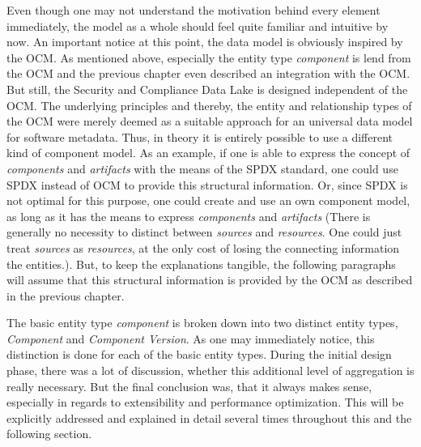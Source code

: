 Even though one may not understand the motivation behind every element immediately, the model as a whole should feel quite familiar and intuitive by now. An important notice at this point, the data model is obviously inspired by the OCM. As mentioned above, especially the entity type \emph{component} is lend from the OCM and the previous chapter even described an integration with the OCM. But still, the Security and Compliance Data Lake is designed independent of the OCM. The underlying principles and thereby, the entity and relationship types of the OCM were merely deemed as a suitable approach for an universal data model for software metadata. Thus, in theory it is entirely possible to use a different kind of component model. As an example, if one is able to express the concept of \emph{components} and \emph{artifacts} with the means of the SPDX standard, one could use SPDX instead of OCM to provide this structural information. Or, since SPDX is not optimal for this purpose, one could create and use an own component model, as long as it has the means to express \emph{components} and \emph{artifacts} (There is generally no necessity to distinct between \emph{sources} and \emph{resources}. One could just treat \emph{sources} as \emph{resources}, at the only cost of losing the connecting information the entities.). But, to keep the explanations tangible, the following paragraphs will assume that this structural information is provided by the OCM as described in the previous chapter. \\\par 
The basic entity type \emph{component} is broken down into two distinct entity types, \emph{Component} and \emph{Component Version}. As one may immediately notice, this distinction is done for each of the basic entity types. During the initial design phase, there was a lot of discussion, whether this additional level of aggregation is really necessary. But the final conclusion was, that it always makes sense, especially in regards to extensibility and performance optimization. This will be explicitly addressed and explained in detail several times throughout this and the following section.\par 
